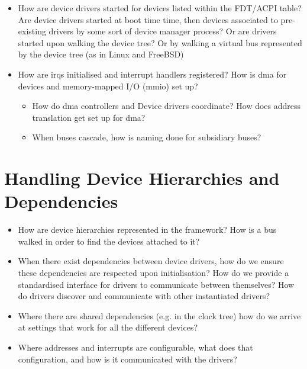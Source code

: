 \documentclass[a4paper,12pt]{report}
\begin{document}
\begin{itemize}
\item How are device drivers started for devices listed within the
  FDT/ACPI table? Are device drivers started at boot time time, then
  devices associated to pre-existing drivers by some sort of device
  manager process? Or are drivers started upon walking the device
  tree? Or by walking a virtual bus represented by the device tree (as
  in Linux and FreeBSD)
\item How are \glspl{irq} initialised and interrupt handlers registered? How
  is \gls{dma} for devices and memory-mapped I/O (\gls{mmio}) set up?
  \begin{itemize}
  \item How do \gls{dma} controllers and Device drivers coordinate?  How does
    address translation get set up for \gls{dma}?
  \item When buses cascade, how is naming done for subsidiary buses?
  \end{itemize}

\end{itemize}

\section{Handling Device Hierarchies and Dependencies}

\begin{itemize}
\item How are device hierarchies represented in the framework?  How is
  a bus walked in order to find the devices attached to it?
\item When there exist dependencies between device drivers, how do we
  ensure these dependencies are respected upon initialisation? How do
  we provide a standardised interface for drivers to communicate
  between themselves?  How do drivers discover and communicate with
  other instantiated drivers?
\item Where there are shared dependencies (e.g. in the clock tree)
  how do we arrive at settings that work for all the different
  devices?
\item Where addresses and interrupts are configurable, what does that
  configuration, and how is it communicated with the drivers?
\end{itemize}
\end{document}
